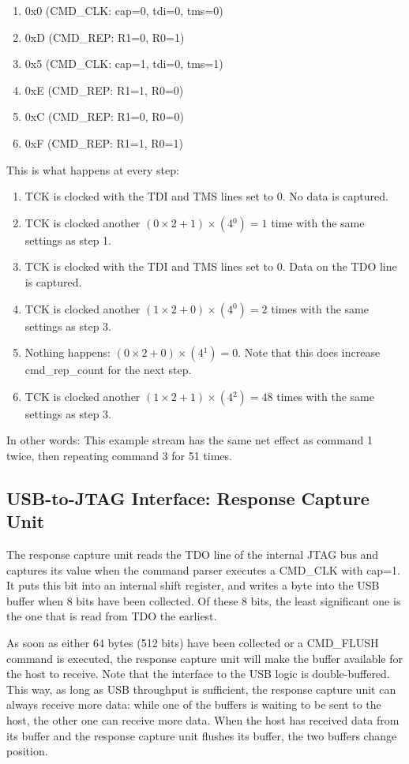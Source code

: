 \documentclass[main\_\_EN.tex]{subfiles}
\begin{document}
\begin{enumerate}
\item 0x{}0 (CMD\_CLK: cap=0, tdi=0, tms=0)
\item 0x{}D (CMD\_REP: R1=0, R0=1)
\item 0x{}5 (CMD\_CLK: cap=1, tdi=0, tms=1)
\item 0x{}E (CMD\_REP: R1=1, R0=0)
\item 0x{}C (CMD\_REP: R1=0, R0=0)
\item 0x{}F (CMD\_REP: R1=1, R0=1)
\end{enumerate}


This is what happens at every step:
\begin{enumerate}
\item TCK is clocked with the TDI and TMS lines set to 0. No data is captured.
\item TCK is clocked another \((0\times2+1)\times(4{^0})=1\) time with the same settings as step 1.
\item TCK is clocked with the TDI and TMS lines set to 0. Data on the TDO line is captured.
\item TCK is clocked another \((1\times2+0)\times(4{^0})=2\) times with the same settings as step 3.
\item Nothing happens: \((0\times2+0)\times(4{^1})=0\). Note that this does increase cmd\_rep\_count for the next step.
\item TCK is clocked another \((1\times2+1)\times(4{^2})=48\) times with the same settings as step 3.
\end{enumerate}

In other words: This example stream has the same net effect as command 1 twice, then repeating command 3 for 51 times.

\subsection{USB-to-JTAG Interface: Response Capture Unit}

The response capture unit reads the TDO line of the internal JTAG bus and captures its value when the command parser executes a CMD\_CLK with cap=1. It puts this bit into an internal shift register, and writes a byte into the USB buffer when 8 bits have been collected. Of these 8 bits, the least significant one is the one that is read from TDO the earliest.

As soon as either 64 bytes (512 bits) have been collected or a CMD\_FLUSH command is executed, the response capture unit will make the buffer available for the host to receive. Note that the interface to the USB logic is double-buffered. This way, as long as USB throughput is sufficient, the response capture unit can always receive more data: while one of the buffers is waiting to be sent to the host, the other one can receive more data. When the host has received data from its buffer and the response capture unit flushes its buffer, the two buffers change position.
\end{document}
